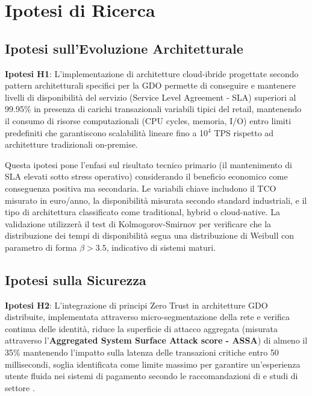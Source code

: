\documentclass[12pt,a4paper,oneside]{book}
\numberwithin{figure}{chapter} %
\numberwithin{table}{chapter}  %
\begin{document}
\section{\texorpdfstring{\textbf {Ipotesi di
Ricerca}}{1.4 Ipotesi di Ricerca}}\label{ipotesi-di-ricerca}

\subsection{\texorpdfstring{\textbf{Ipotesi sull'Evoluzione
Architetturale}}{1.4.1 Ipotesi sull'Evoluzione Architetturale}}\label{ipotesi-sullevoluzione-architetturale}

\textbf{Ipotesi H1}: L'implementazione di architetture cloud-ibride progettate
secondo pattern architetturali specifici per la GDO permette di
conseguire e mantenere livelli di disponibilità del servizio (Service Level Agreement - SLA) superiori al 99.95\% in presenza di carichi transazionali variabili tipici del retail, mantenendo il consumo di risorse computazionali (CPU cycles, memoria, I/O) entro limiti predefiniti che garantiscono scalabilità lineare fino a 10$^4$ TPS rispetto ad architetture tradizionali on-premise.

Questa ipotesi pone l'enfasi sul risultato tecnico primario (il
mantenimento di SLA elevati sotto stress operativo) considerando il beneficio economico come conseguenza positiva ma secondaria. Le
variabili chiave includono il TCO misurato in euro/anno, la disponibilità misurata secondo standard industriali, e il tipo di architettura classificato come traditional, hybrid o cloud-native.
La validazione utilizzerà il test di Kolmogorov-Smirnov per verificare che la distribuzione dei tempi di disponibilità segua una distribuzione di Weibull con parametro di forma $\beta > 3.5$, indicativo di sistemi maturi.

\subsection{\texorpdfstring{\textbf{Ipotesi sulla
Sicurezza}}{1.4.2 Ipotesi sulla Sicurezza}}\label{ipotesi-sulla-sicurezza}

\textbf{Ipotesi H2}: L'integrazione di principi Zero Trust in architetture GDO distribuite, implementata attraverso micro-segmentazione della rete e verifica continua delle identità, riduce la superficie di attacco aggregata (misurata attraverso l'\textbf{Aggregated System Surface Attack score - ASSA}) di almeno il 35\% mantenendo l'impatto sulla latenza delle transazioni critiche entro 50 millisecondi, soglia identificata come limite massimo per garantire un'esperienza utente fluida nei sistemi di pagamento secondo le raccomandazioni di \cite{ISO8583} e studi di settore \cite{latencyUXPayments}.
\end{document}
